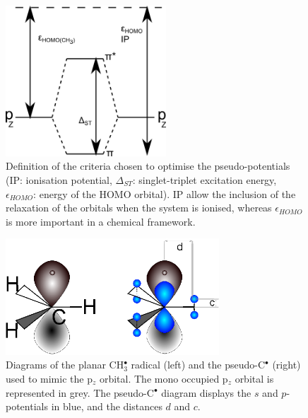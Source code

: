 \documentclass[12pt]{article}
\begin{document}
\begin{figure}
\begin{center}
\includegraphics[width=6cm]{diagram.png}
\end{center}
\vspace{0.25in}
\hspace*{3in}
	\caption{Definition of the criteria chosen to optimise the pseudo-potentials
	(IP: ionisation potential, $\Delta_{ST}$: singlet-triplet excitation energy, $\epsilon_{HOMO}$: energy of the HOMO orbital).
	IP allow the inclusion of the relaxation of the orbitals when the system is ionised, whereas $\epsilon_{HOMO}$ is more important
	in a chemical framework.}
\label{figure:diagram}
\end{figure}

\begin{figure}
\begin{center}
\includegraphics[width=8cm]{scheme_complete.eps}
\end{center}
\caption{Diagrams of the planar CH\(^{\bullet}_{3}\) radical (left) and the pseudo-C\(^{\bullet}\) (right)
used to mimic the p$_z$ orbital.
The mono occupied p$_z$ orbital is represented in grey.
The pseudo-C\(^{\bullet}\) diagram displays the \(s\) and \(p\)-potentials in blue,
and the distances \(d\) and \(c\).}
\label{figure:ref_pseudo_diagram}
\end{figure}
\end{document}

